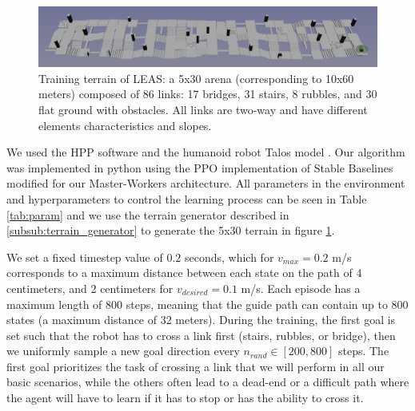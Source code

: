 \begin{figure}
    \centering
    \includegraphics[width=\textwidth]{Figures/Chapter_LEAS/arena_5x30.png}
    \caption{Training terrain of LEAS: a 5x30 arena (corresponding to 10x60 meters) composed of 86 links: 17 bridges, 31 stairs, 8 rubbles, and 30 flat ground with obstacles. All links are two-way and have different elements characteristics and slopes.}
    \label{fig:arena_5x30}
\end{figure}

We used the HPP software \cite{HPP} and the humanoid robot Talos model \cite{talos_robot}. Our algorithm was implemented in python using the PPO implementation of Stable Baselines \cite{stable-baselines} modified for our Master-Workers architecture.
All parameters in the environment and hyperparameters to control the learning process can be seen in Table \ref{tab:param} and we use the terrain generator described in \ref{subsub:terrain_generator} to generate the 5x30 terrain in figure \ref{fig:arena_5x30}.

We set a fixed timestep value of $0.2$ seconds, which for $v_{max}=0.2$ m/s corresponds to a maximum distance between each state on the path of 4 centimeters, and 2 centimeters for $v_{desired}=0.1$ m/s.
Each episode has a maximum length of $800$ steps, meaning that the guide path can contain up to $800$ states (a maximum distance of 32 meters). During the training, the first goal is set such that the robot has to cross a link first (stairs, rubbles, or bridge), then we uniformly sample a new goal direction every $n_{rand} \in [200,800]$ steps. The first goal prioritizes the task of crossing a link that we will perform in all our basic scenarios, while the others often lead to a dead-end or a difficult path where the agent will have to learn if it has to stop or has the ability to cross it.

